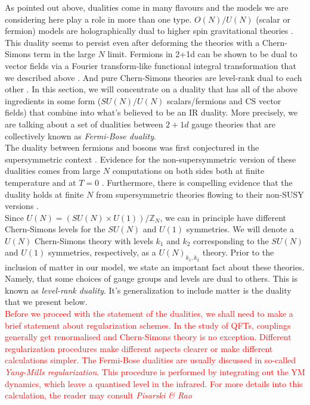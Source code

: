         \indent As pointed out above, dualities come in many flavours and the models we are considering here play a role in more than one type. $O(N)/U(N)$ (scalar or fermion) models are holographically dual to higher spin gravitational theories \cite{Klebanov:2002ja}. This duality seems to persist even after deforming the theories with a Chern-Simons term in the large $N$ limit\cite{Aharony:2011jz}. Fermions in 2+1d can be shown to be dual to vector fields via a Fourier transform-like functional integral transformation that we described above \cite{Burgess:1993np, Barci:1995iy}. And pure Chern-Simons theories are level-rank dual to each other \cite{Naculich:1990pa, Camperi:1990dk, Mlawer:1990uv, Nakanishi:1990hj, Naculich:2007nc}. In this section, we will concentrate on a duality that has all of the above ingredients in some form ($SU(N)/U(N)$ scalars/fermions and CS vector fields) that combine into what's believed to be an IR duality. More precisely, we are talking about a set of dualities between $2+1d$ gauge theories that are collectively known as \textit{Fermi-Bose duality}.\\
        \indent The duality between fermions and bosons was first conjectured  in the supersymmetric context \cite{Giveon:2008zn, Benini:2011mf, Aharony:2013dha, Aharony:2014uya}. Evidence for the non-supersymmetric version of these dualities comes from large $N$ computations on both sides both at finite temperature \cite{Aharony:2012ns}  and at $T=0$ \cite{Giombi:2011kc}. Furthermore, there is compelling evidence that the duality holds at finite $N$ from supersymmetric theories flowing to their non-SUSY versions \cite{Jain:2013gza, Gur-Ari:2015pca}.\\
        \indent Since $U(N) = (SU(N)\times U(1))/\mathbb{Z}_N$, we can in principle have different Chern-Simons levels for the $SU(N)$ and $U(1)$ symmetries. We will denote a $U(N)$ Chern-Simons theory with levels $k_1$ and $k_2$ corresponding to the $SU(N)$ and $U(1)$ symmetries, respectively, as a $U(N)_{k_1,k_2}$ theory. Prior to the inclusion of matter in our model, we state an important fact about these theories. Namely, that some choices of gauge groups and levels are dual to others. This is known as \textit{level-rank duality}. It's generalization to include matter is the duality that we present below.\\
\indent \textcolor{red}{Before we proceed with the statement of the dualities, we shall need to make a brief statement about regularization schemes. In the study of QFTs, couplings generally get renormali\textcolor{red}{s}ed and Chern-Simons theory is no exception. Different regularization procedures make different aspects clearer or make different calculations simpler. The Fermi-Bose dualities are usually discussed in so-called \textit{Yang-Mills regularization}. This procedure is performed by integrating out the YM dynamics, which leave a quanti\textcolor{red}{s}ed level in the infrared. For more details into this calculation, the reader may consult \textit{Pisarski \& Rao} \cite{PhysRevD.32.2081}}\\
